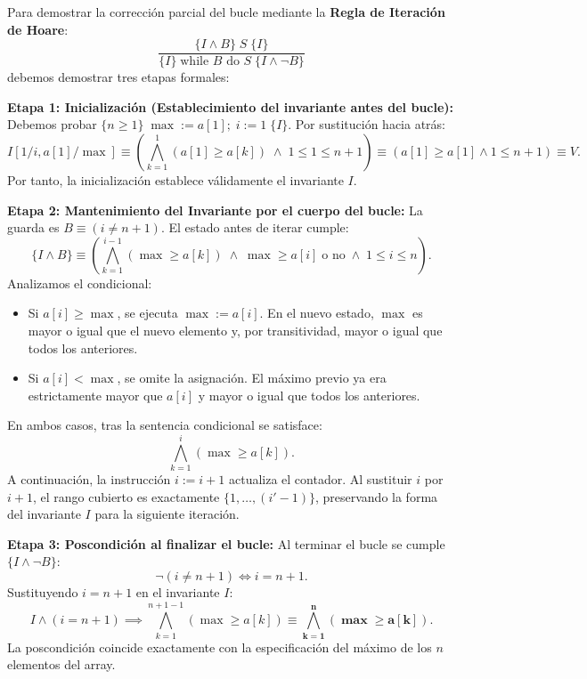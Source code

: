 \begin{solucion}
Para demostrar la corrección parcial del bucle mediante la \textbf{Regla de Iteración de Hoare}:
\[
\frac{\{I \land B\} \; S \; \{I\}}{\{I\} \; \text{while } B \text{ do } S \; \{I \land \neg B\}}
\]
debemos demostrar tres etapas formales:

\textbf{Etapa 1: Inicialización (Establecimiento del invariante antes del bucle):}
Debemos probar $\{n \ge 1\} \; \max := a[1]; \; i := 1 \; \{I\}$.
Por sustitución hacia atrás:
\[
I[1 / i, a[1] / \max] \equiv \left( \bigwedge_{k=1}^1 (a[1] \ge a[k]) \;\land\; 1 \le 1 \le n + 1 \right) \equiv (a[1] \ge a[1] \land 1 \le n + 1) \equiv V.
\]
Por tanto, la inicialización establece válidamente el invariante $I$.

\textbf{Etapa 2: Mantenimiento del Invariante por el cuerpo del bucle:}
La guarda es $B \equiv (i \neq n + 1)$. El estado antes de iterar cumple:
\[
\{I \land B\} \equiv \left( \bigwedge_{k=1}^{i-1} (\max \ge a[k]) \;\land\; \max \ge a[i] \;\text{o no} \;\land\; 1 \le i \le n \right).
\]
Analizamos el condicional:
\begin{itemize}
    \item Si $a[i] \ge \max$, se ejecuta $\max := a[i]$. En el nuevo estado, $\max$ es mayor o igual que el nuevo elemento y, por transitividad, mayor o igual que todos los anteriores.
    \item Si $a[i] < \max$, se omite la asignación. El máximo previo ya era estrictamente mayor que $a[i]$ y mayor o igual que todos los anteriores.
\end{itemize}
En ambos casos, tras la sentencia condicional se satisface:
\[
\bigwedge_{k=1}^i (\max \ge a[k]).
\]
A continuación, la instrucción $i := i + 1$ actualiza el contador. Al sustituir $i$ por $i + 1$, el rango cubierto es exactamente $\{1, \dots, (i' - 1)\}$, preservando la forma del invariante $I$ para la siguiente iteración.

\textbf{Etapa 3: Poscondición al finalizar el bucle:}
Al terminar el bucle se cumple $\{I \land \neg B\}$:
\[
\neg(i \neq n + 1) \iff i = n + 1.
\]
Sustituyendo $i = n + 1$ en el invariante $I$:
\[
I \land (i = n + 1) \implies \bigwedge_{k=1}^{n+1 - 1} (\max \ge a[k]) \equiv \mathbf{\bigwedge_{k=1}^n (\max \ge a[k])}.
\]
La poscondición coincide exactamente con la especificación del máximo de los $n$ elementos del array.
\end{solucion}

